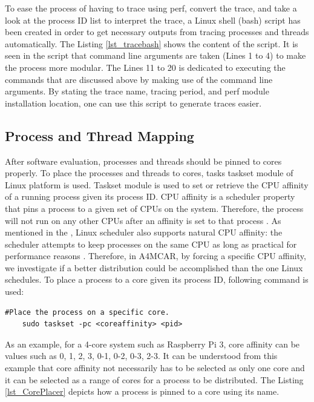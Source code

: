 \begin{itemize}
	To ease the process of having to trace using perf, convert the trace, and take a look at the process ID list to interpret the trace, a Linux shell (bash) script has been created in order to get necessary outputs from tracing processes and threads automatically. The Listing \ref{lst_tracebash} shows the content of the script. It is seen in the script that command line arguments are taken (Lines 1 to 4) to make the process more modular. The Lines 11 to 20 is dedicated to executing the commands that are discussed above by making use of the command line arguments. By stating the trace name, tracing period, and perf module installation location, one can use this script to generate traces easier. %
	
	
\end{itemize}

\subsection{Process and Thread Mapping}
After software evaluation, processes and threads should be pinned to cores properly. To place the processes and threads to cores, tasks taskset module of Linux platform is used. Taskset module \cite{taskset} is used to set or retrieve the CPU affinity of a running process given its process ID. CPU affinity is a scheduler property that pins a process to a given set of CPUs on the system. Therefore, the process will not run on any other CPUs after an affinity is set to that process \cite{taskset}. As mentioned in the \cite{taskset}, Linux scheduler also supports natural CPU affinity: the scheduler attempts to keep processes on the same CPU as long as practical for performance reasons \cite{taskset}. Therefore, in A4MCAR, by forcing a specific CPU affinity, we investigate if a better distribution could be accomplished than the one Linux schedules. To place a process to a core given its process ID, following command is used:

\begin{lstlisting}[style=bash]
	#Place the process on a specific core.
	sudo taskset -pc <coreaffinity> <pid>
\end{lstlisting}

As an example, for a 4-core system such as Raspberry Pi 3, core affinity can be values such as 0, 1, 2, 3, 0-1, 0-2, 0-3, 2-3. It can be understood from this example that core affinity not necessarily has to be selected as only one core and it can be selected as a range of cores for a process to be distributed. The Listing \ref{lst_CorePlacer} depicts how a process is pinned to a core using its name.


